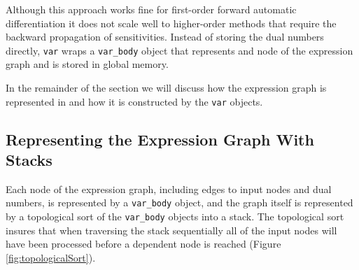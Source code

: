 Although this approach works fine for first-order forward automatic
differentiation it does not scale well to higher-order methods that
require the backward propagation of sensitivities.  Instead of storing
the dual numbers directly, \verb|var| wraps a \verb|var_body| object
that represents and node of the expression graph and is stored
in global memory.

In the remainder of the section we will discuss how the expression
graph is represented in \nomad and how it is constructed by the
\verb|var| objects.

\subsection{Representing the Expression Graph With Stacks}

Each node of the expression graph, including edges to input nodes
and dual numbers, is represented by a \verb|var_body| object, and
the graph itself is represented by a topological sort of the \verb|var_body|
objects into a stack.  The topological sort insures that when traversing
the stack sequentially all of the input nodes will have been processed
before a dependent node is reached (Figure \ref{fig:topologicalSort}).

